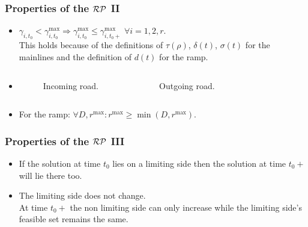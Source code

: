 \begin{frame}[fragile]
	\frametitle{Properties of the $\mathcal{RP}$ II}
\begin{itemize}
	
	\item<1-> $\gamma_{i,t_{0}}<\gamma^{\max}_{i,t_{0}} \Rightarrow \gamma^{\max}_{i,t_{0}}\leq\gamma^{\max}_{i,t_{0}+}$ $\forall i=1,2,r$. \\ \vspace*{3mm} This holds because of the definitions of $\tau(\rho)$, $\delta(t)$, $\sigma(t)$ for the mainlines and the definition of $d(t)$ for the ramp.\\
	\item[] {\begin{columns}
	\begin{figure}[ht]
\centering
{
\resizebox{.9\columnwidth}{!}{
}
\caption{Incoming road.}
\label{fig:PI2}}
\end{figure}
	\begin{figure}[ht]
\centering
{
\resizebox{.9\columnwidth}{!}{
}
\caption{Outgoing road.}
\label{fig:PO1}}
\end{figure}
\end{columns}}
\item[]{ For the ramp: $\forall D,r^{\max}:r^{\max}\ge\min\left(D,r^{\max}\right).$}
	\end{itemize}
\end{frame}	

\begin{frame}[fragile]
	\frametitle{Properties of the $\mathcal{RP}$ III}
	\begin{itemize}
		\item If the solution at time $t_0$ lies on a limiting side then the solution at time $t_0+$ will lie there too.
		\vspace*{3mm}
		\item The limiting side does not change.\\ At time $t_0+$ the non limiting side can only increase while the limiting side's feasible set remains the same.
	\end{itemize}
\end{frame}
